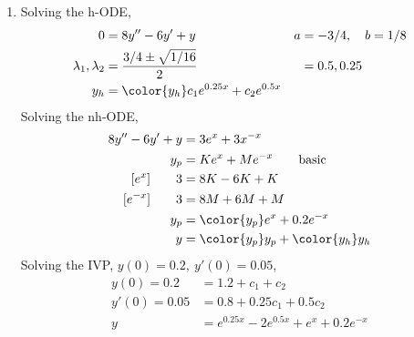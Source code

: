 \begin{enumerate}
    \item Solving the h-ODE,
          \begin{align}
              0                        & = 8y'' - 6y' + y                &
              a                        & = -3/4, \quad b = 1/8             \\
              \lambda_{1}, \lambda_{2} & = \frac{3/4 \pm \sqrt{1/16}}{2} &
                                       & = 0.5, 0.25                       \\
              y_{h}                    & = \color{y_h} c_{1}e^{0.25x}
              + c_{2}e^{0.5x}
          \end{align}
          Solving the nh-ODE,
          \begin{align}
              8y'' - 6y' + y    & = 3e^{x} + 3x^{-x}                          \\
              y_{p}             & = Ke^{x} + Me^{-x} \qquad \text{basic}      \\
              [e^{x}] \qquad 3  & = 8K - 6K + K                               \\
              [e^{-x}] \qquad 3 & = 8M + 6M + M                               \\
              y_{p}             & = \color{y_p} e^{x} + 0.2e^{-x}             \\
              y                 & = {\color{y_p} y_{p}} + {\color{y_h} y_{h}}
          \end{align}
          Solving the IVP, $ y(0) = 0.2,\ y'(0) = 0.05 $,
          \begin{align}
              y(0) = 0.2   & = 1.2 + c_{1} + c_{2}                       \\
              y'(0) = 0.05 & = 0.8 + 0.25c_{1} + 0.5c_{2}                \\
              y            & = e^{0.25x} - 2e^{0.5x} + e^{x} + 0.2e^{-x}
          \end{align}


\end{enumerate}
